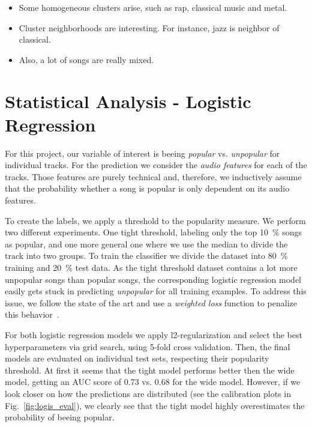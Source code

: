 \documentclass{article}
\begin{document}
\begin{itemize}
  \item Some homogeneous clusters arise, such as rap, classical music and metal. 
  \item Cluster neighborhoods are interesting. For instance, jazz is neighbor of classical.
  \item Also, a lot of songs are really mixed.
\end{itemize}

\section{Statistical Analysis - Logistic Regression}
For this project, our variable of interest is beeing \textit{popular} vs. \textit{unpopular} for individual tracks.
For the prediction we consider the \textit{audio features} for each of the tracks. 
Those features are purely technical and, therefore, we inductively assume that the probability whether a song is popular is only dependent on its audio features. 

To create the labels, we apply a threshold to the popularity measure. 
We perform two different experiments. 
One tight threshold, labeling only the top \SI{10}{\percent} songs as popular, and one more general one where we use the median to divide the track into two groups.
To train the classifier we divide the dataset into \SI{80}{\percent} training and \SI{20}{\percent} test data.
As the tight threshold dataset contains a lot more unpopular songs than popular songs, the corresponding logistic regression model easily gets stuck in predicting \textit{unpopular} for all training examples. 
To address this issue, we follow the state of the art and use a \textit{weighted loss} function to penalize this behavior~\cite{haixiangLearningClassimbalancedData2017a}.

For both logistic regression models we apply l2-regularization and select the best hyperparameters via grid search, using 5-fold cross validation. Then, the final models are evaluated on individual test sets, respecting their popularity threshold.
At first it seems that the tight model performs better then the wide model, getting an AUC score of \num{0.73} vs. \num{0.68} for the wide model.
%
However, if we look closer on how the predictions are distributed (see the calibration plots in Fig.~\ref{fig:logis_eval}), we clearly see that the tight model highly overestimates the probability of beeing popular.
\end{document}
